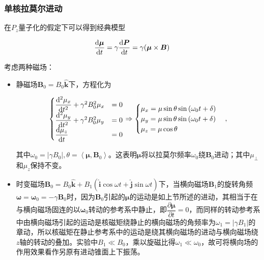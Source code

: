 \subsubsection{单核拉莫尔进动}\label{ux5355ux6838ux62c9ux83abux5c14ux8fdbux52a8}

在\(P_z\)量子化的假定下可以得到经典模型

\begin{equation}
    \dfrac{{\rm d}\boldsymbol{\mu}}{{\rm d}t} = \gamma\dfrac{{\rm d}\boldsymbol{P}}{{\rm d}t} = \gamma (\boldsymbol{\mu}\times \boldsymbol{B})
\end{equation}

考虑两种磁场：

\begin{itemize}

\item
  静磁场\(\boldsymbol{B}_0 = B_0\hat{\boldsymbol{k}}\)下，方程化为

\begin{equation}
\begin{cases}
        \dfrac{{\rm d}^2\mu_x}{{\rm d}t^2} + \gamma^2B_0^2\mu_x & = 0\\
        \dfrac{{\rm d}^2\mu_y}{{\rm d}t^2} + \gamma^2B_0^2\mu_y & = 0\\
        \dfrac{{\rm d}\mu_z}{{\rm d}t} & = 0
    \end{cases}
    \Rightarrow
    \begin{cases}
        \mu_x = \mu \sin{\theta}\sin{\left(\omega_0 t + \delta\right)}\\
        \mu_y = \mu \sin{\theta}\sin{\left(\omega_0 t + \delta\right)}\\
        \mu_z = \mu \cos{\theta}
    \end{cases},
\end{equation}

​
其中\(\omega_0 = |\gamma B_0|, \theta = \left<\boldsymbol{\mu}, \boldsymbol{B}_0\right>\)。这表明\(\boldsymbol{\mu}\)将以拉莫尔频率\(\omega_0\)绕\(\boldsymbol{B}_0\)进动；其中\(\mu_{\perp}\)和\(\mu_z\)保持不变。

\item
  时变磁场\(\boldsymbol{B}_0 = B_0\hat{\boldsymbol{k}}+B_1(\hat{\boldsymbol{i}}\cos{\omega t} + \hat{\boldsymbol{j}}\sin{\omega t})\)下，当横向磁场\(\boldsymbol{B}_1\)的旋转角频\(\boldsymbol{\omega} = \boldsymbol{\omega}_0 = -\gamma \boldsymbol{B}_0\)时，因为\(\boldsymbol{B}_0\)引起的\(\boldsymbol{\mu}\)的运动是如上节所述的进动，其相当于在与横向磁场固连的以\(\boldsymbol{\omega}_0\)转动的参考系中静止，即\(\dfrac{\partial \boldsymbol{\mu}}{\partial t} = 0\)，而同样的转动参考系中由横向磁场引起的运动是核磁矩绕静止的横向磁场的角频率为\(\omega_1 = |\gamma B_1|\)的章动，所以核磁矩在静止参考系中的运动是绕其横向磁场的进动与横向磁场绕\(z\)轴的转动的叠加。实验中\(B_1\ll B_0\)，乘以旋磁比得\(\omega_1\ll \omega_0\)，故可将横向场的作用效果看作另原有进动锥面上下振荡。
\end{itemize}

